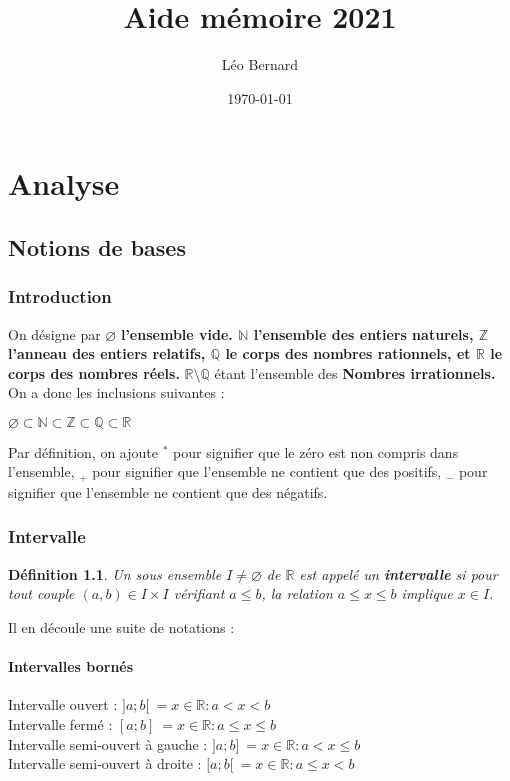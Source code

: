 \documentclass[12pt, a4paper]{book}
\title{Aide mémoire 2021}
\date{\today}
\author{Léo Bernard}
\newtheorem*{definition}{Définition}
\let\emptyset\varnothing
\begin{document}
\maketitle
\tableofcontents

\chapter{Analyse}
\section{Notions de bases}
\subsection{Introduction}
On désigne par $\emptyset$ \textbf{l'ensemble vide. $\mathbb{N}$ l'ensemble des entiers naturels, $\mathbb{Z}$ l'anneau des entiers relatifs, $\mathbb{Q}$ le corps des nombres rationnels, et $\mathbb{R}$ le corps des nombres réels.} $\mathbb{R} \setminus \mathbb{Q}$ étant l'ensemble des \textbf{Nombres irrationnels.} On a donc les inclusions suivantes :\\
\begin{center}
    $\emptyset \subset \mathbb{N} \subset \mathbb{Z} \subset \mathbb{Q} \subset \mathbb{R}$
\end{center}
Par définition, on ajoute ${}^*$ pour signifier que le zéro est non compris dans l'ensemble, ${}_+$ pour signifier que l'ensemble ne contient que des positifs, ${}_-$ pour signifier que l'ensemble ne contient que des négatifs.
\subsection{Intervalle}
\begin{definition}
    Un sous ensemble $I \not = \emptyset$ de $\mathbb{R}$ est appelé un
    \textbf{intervalle} si pour tout couple $(a,b) \in I \times I$ vérifiant
     $a \leq b$, la relation $a \leq x \leq b$ implique $x \in I $.
\end{definition}
Il en découle une suite de notations :
\newpage
\subsubsection{Intervalles bornés}
Intervalle ouvert : $]a;b[ \ = ${$x \in \mathbb{R}:a < x < b$}\\
Intervalle fermé : $[a;b]\ = ${$x \in \mathbb{R}:a \leq x \leq b$}\\
Intervalle semi-ouvert à gauche : $]a;b]\ = ${$x \in \mathbb{R}:a < x \leq b$}\\
Intervalle semi-ouvert à droite : $[a;b[ \ = ${$x \in \mathbb{R}:a \leq x < b$}\\
\end{document}
